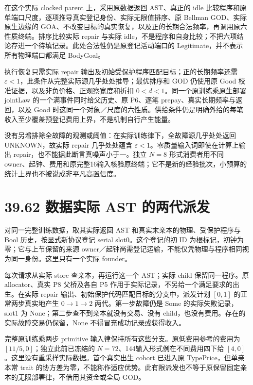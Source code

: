 \documentclass[
  11pt,
  oneside]{book}
\begin{document}
在这个实际 clocked parent 上，采用原数据返回 AST、真正的 idle 比较程序和原单端口尺度，逐项推导真实登记身份、实际无限值排序、原 Bellman GOD、实际原生边缘的 GOA、不改变目标的真实恢复，以及正的长期合法频率，再调用原六性质终端。排序比较实际 repair 与实际 idle，不是程序和自身比较；不把六项结论存进一个待填记录。此处合法性仍是原登记活动端口的 Legitimate，并不表示所有物理端口都满足 BodyGoal。

执行恢复只需实际 repair 输出及初始受保护程序匹配目标；正的长期频率还需 \(\varepsilon<1\)，此条件从完整实际源几乎处处推导；最优排序和 GOD 仍使用原 Good 校准证据，以及非负价格、正观察宽度和折扣 \(0<d<1\)。同一个原训练乘原生部署 jointLaw 的一个满事件同时给父历史、原 P6、逐笔 prepay、真实长期频率与返回，以及 Good 时这同一个对象／尺度的六性质。供给条件仍是明确外给的每笔收入至少覆盖预登记费用上界，不是机制自行产生能量。

没有另增排除全故障的观测或阈值：在实际训练律下，全故障源几乎处处返回 UNKNOWN，故实际 repair 几乎处处蕴含 \(\varepsilon<1\)。零质量输入词即使在计算上输出 repair，也不能据此断言真噪声小于一。独立 \(N=8\) 形式消费者用不同 owner、起钟、费用和原完整16输入核验原终端；它不是新的经验批次，小预算的统计上界也不被说成非平凡高置信度。

\section{39.62 数据实际 AST 的两代派发}\label{ux6570ux636eux5b9eux9645-ast-ux7684ux4e24ux4ee3ux6d3eux53d1}

对同一完整训练数据，取其实际返回 AST 和真实末亲本的物理、受保护程序与 Bool 历史，按显式新协议登记 serial slot0。这个登记的初 ID 为根标记，初钟为零；它与上节保留的来源 owner／起钟尚需登记运输，不能仅凭物理与程序相同视为同一身份。这里只有一个实际 founder。

每次请求从实际 store 查亲本，再运行这一个 AST；实际 child 保留同一程序。原 allocator、真实 P8 父桥及各自 P5 作用于实际记录，不另给一个满足要求的出生。在实际 repair 输出、初始保护代码匹配目标的分支中，派发计划 \([0,1]\) 的正常两步真实地产生 \(0\to1\to2\) 两代。第一步故障仍是 Some 的实际失败记录，slot1 为 None；第二步查不到亲本就没有交易、没有 child，也没有费用。存在的实际故障交易仍保留，None 不得冒充成功记录或获得收入。

完整原训练乘两步 primitive 输入律保持所有这些分支。原低费用参考的费用为 \([11/5,0]\)；独立此前已冻结的 \(N=72\)、144输入形式例在不同费用四下给 \([4,0]\)。这里没有重采样实际数据。首个真实出生 cohort 已进入原 TypePrice，但单亲本常 trait 的协方差为零，不能称作适应优势。此有限派发也不等于原保留固定亲本的无限部署律，不借用其资金或全局 GOD。
\end{document}
